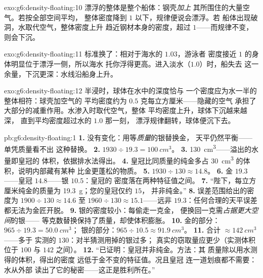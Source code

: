 \begin{solution}{exo:g6:density-floating:10}
漂浮的整体是整个船体：钢壳\emph{加上}
其所围住的大量空气。若按全部空间平均，
整体密度降到 $1$ 以下，规律便说会漂浮。若
船体出现破洞，水取代空气，整体密度上升
趋近钢材本身的密度，超过 $1$——而规律不变，
则会下沉。
\end{solution}

\begin{solution}{exo:g6:density-floating:11}
标准换了：相对于海水的 $1.03$，游泳者
密度接近 $1$ 的身体明显位于漂浮一侧，所以海水
托你浮得更高。进入淡水（$1.0$）时，船失去
这一余量，下沉更深：水线沿船身上升。
\end{solution}

\begin{solution}{exo:g6:density-floating:12}
半浸时，球体在水中的深度恰与
一个密度应为水一半的整体相符：球壳加空气的
平均密度约为 $0.5$ 克每立方厘米——隐藏的空气
承担了大部分的减重作用。水渗入时取代空气，整体
平均密度上升，球体下沉越来越深，
直到平均密度超过水的 $1.0$ 那一刻，
漂浮规律翻转，球体便沉下去。
\end{solution}

\begin{solution}{pb:g6:density-floating:1}
\textbf{1.} 没有变化：用等\emph{质量}的银替换金，
天平仍然平衡——单凭质量看不出
这种替换。
\textbf{2.} $1930 \div 19.3 = \qty{100}{cm^3}$。
\textbf{3.} \qty{130}{cm^3}——溢出的水量即皇冠的
体积，依据排水法得出。
\textbf{4.} 皇冠比同质量的纯金多占 \qty{30}{cm^3}
的体积，说明内部藏有某种
比金更蓬松的物质。
\textbf{5.} $1930 \div 130 \approx 14.8$。
\textbf{6.} 金 $19.3$——皇冠 $14.8$——银 $10.5$：皇冠的
密度落在两种特征值之间。
\textbf{7.} “陛下，每立方厘米纯金的质量为
\qty{19.3}{g}；您的皇冠仅约 $15$，
并非纯金。”
\textbf{8.} 误差范围给出的密度为 $1900 \div 130 \approx
14.6$ 至 $1960 \div 130 \approx 15.1$——远非
$19.3$：任何合理的天平误差都无法为金匠开脱。
\textbf{9.} 银的密度较小：每偷走一克金，
便换回一克需\emph{占据更大空间}的银——
等克数替换保持了质量，却使体积膨胀。
\textbf{10.} 金的部分：$965 \div 19.3 = \qty{50.0}{cm^3}$；
银的部分：$965 \div 10.5 \approx \qty{91.9}{cm^3}$。
\textbf{11.} 合计 $\approx \qty{142}{cm^3}$——多于
实测的 $130$：对半猜测用掉的银过多；
真实的窃取量应更少（实测体积位于
$100$ 与 $142$ 之间）。
\textbf{12.} “已证明：皇冠并非纯金。方法：其
质量除以用水测得的体积，得出的密度
远低于金不变的特征值。况且皇冠
连一道划痕都不需要：水从外部
读出了它的秘密——这正是胜利所在。”
\end{solution}
